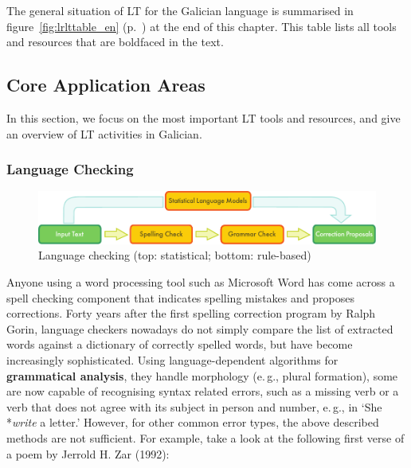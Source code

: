 \begin{multicols}{2}
The general situation of LT for the Galician language is summarised in figure~\ref{fig:lrlttable_en} (p.~\pageref{fig:lrlttable_en}) at the end of this chapter. This table lists all tools and resources that are boldfaced in the text.


\subsection{Core Application Areas}

In this section, we focus on the most important LT tools and resources, and give an overview of LT activities in Galician. %

\subsubsection{Language Checking}

\begin{figure}[htb]
  \center
  \includegraphics[width=\textwidth]{../_media/english/language_checking}
  \caption{Language checking (top: statistical; bottom: rule-based)}
  \label{fig:langcheckingaarch_en}
\end{figure}

Anyone using a word processing tool such as Microsoft Word has come across a spell checking component that indicates spelling mistakes and proposes corrections. Forty years after the first spelling correction program by Ralph Gorin, language checkers nowadays do not simply compare the list of extracted words against a dictionary of correctly spelled words, but have become increasingly sophisticated.  Using language-dependent algorithms for \textbf{grammatical analysis}, they handle mor\-pho\-lo\-gy (e.\,g., plural formation), some are now capable of recognising syntax related errors, such as a missing verb or a verb that does not agree with its subject in person and number, e.\,g., in ‘She *\textit{write} a letter.’ However, for other common error types, the above described methods are not sufficient. For example, take a look at the following first verse of a poem by Jerrold H. Zar (1992): 


\end{multicols}
